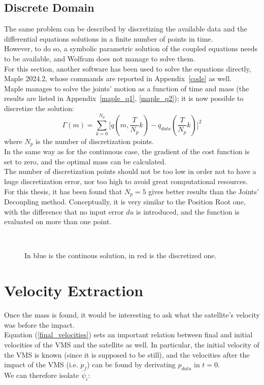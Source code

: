 \documentclass[a4paper,12pt,oneside]{report}
\begin{document}
\subsection{Discrete Domain}
The same problem can be described by discretizing the available data and the differential equations solutions in a finite number of points in time.\\
However, to do so, a symbolic parametric solution of the coupled equations needs to be available, and Wolfram does not manage to solve them.\\
For this section, another software has been used to solve the equations directly, Maple 2024.2, whose commands are reported in Appendix~\ref{code} as well.\\
Maple manages to solve the joints' motion as a function of time and mass (the results are listed in Appendix~\ref{maple_q1}, \ref{maple_q2}); it is now possible to discretize the solution:
\begin{equation}
  \varGamma(m)=\sum_{k=0}^{N_p}\Big[q(m,\frac{T}{N_p}k)-q_{data}(\frac{T}{N_p}k)\Big]^2
\end{equation}
where $N_p$ is the number of discretization points.\\
In the same way as for the continuous case, the gradient of the cost function is set to zero, and the optimal mass can be calculated.\\
The number of discretization points should not be too low in order not to have a huge discretization error, nor too high to avoid great computational resources.\\
For this thesis, it has been found that $N_p=5$ gives better results than the Joints' Decoupling method. Conceptually, it is very similar to the Position Root one, with the difference that no input error $du$ is introduced, and the function is evaluated on more than one point.
\begin{figure}[h]
  \centering
  \subfloat[\emph{$N_p=5$.}]
  {} \quad
\subfloat[\emph{$N_p=25$.}]
  {}\\
  \subfloat[\emph{$N_p=50$.}]
  {}
  \caption{In blue is the continous solution, in red is the discretized one.}
\end{figure}
\newpage
\section{Velocity Extraction}
Once the mass is found, it would be interesting to ask what the satellite's velocity was before the impact.\\
Equation (\ref{final_velocities}) sets an important relation between final and initial velocities of the VMS and the satellite as well. In particular, the initial velocity of the VMS is known (since it is supposed to be still), and the velocities after the impact of the VMS (i.e. $\dot{p}_f$) can be found by derivating $p_{data}$ in $t=0$.\\
We can therefore isolate $\dot{\psi}_i$:
 
\end{document}
